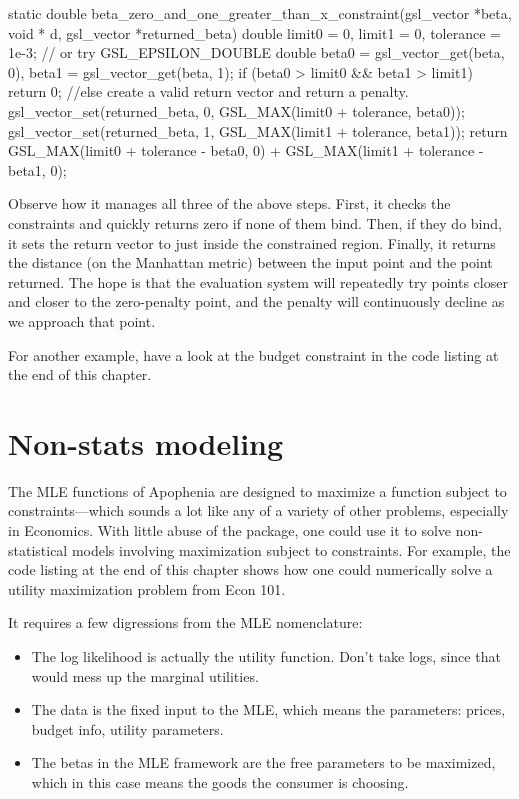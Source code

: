 static double beta_zero_and_one_greater_than_x_constraint(gsl_vector *beta, 
                                    void * d, gsl_vector *returned_beta){
double          limit0          = 0,
                limit1          = 0,
                tolerance       = 1e-3; // or try GSL_EPSILON_DOUBLE
double          beta0   = gsl_vector_get(beta, 0),
                beta1   = gsl_vector_get(beta, 1);
        if (beta0 > limit0 && beta1 > limit1)
                return 0;
        //else create a valid return vector and return a penalty.
        gsl_vector_set(returned_beta, 0, GSL_MAX(limit0 + tolerance, beta0)); 
        gsl_vector_set(returned_beta, 1, GSL_MAX(limit1 + tolerance, beta1));
        return GSL_MAX(limit0 + tolerance - beta0, 0) 
                        + GSL_MAX(limit1 + tolerance - beta1, 0); 
}

Observe how it manages all three of the above steps. First, it checks
the constraints and quickly returns zero if none of them bind. Then, if
they do bind, it sets the return vector to just inside the constrained
region. Finally, it returns the distance (on the Manhattan metric)
between the input point and the point returned. The hope is that the
evaluation system will repeatedly try points closer and closer to the
zero-penalty point, and the penalty will continuously decline as we
approach that point.

For another example, have a look at the budget constraint in the code
listing at the end of this chapter.

\section{Non-stats modeling}    \label{econ101}

The MLE functions of Apophenia are designed to maximize a function
subject to constraints---which sounds a lot like any of a variety of
other problems, especially in Economics. With little abuse of the package,
one could use it to solve non-statistical models involving maximization
subject to constraints. For example, the code listing at the end of this
chapter shows how one could numerically solve a utility maximization
problem from Econ 101. 

It requires a few digressions from the MLE nomenclature:
\begin{itemize}
\item The log likelihood is actually the utility function. Don't take logs,
since that would mess up the marginal utilities.

\item The data is the fixed input to the MLE, which means the parameters:
prices, budget info, utility parameters.

\item The betas in the MLE framework are the free parameters to be
maximized, which in this case means the goods the consumer is choosing.
\end{itemize}

